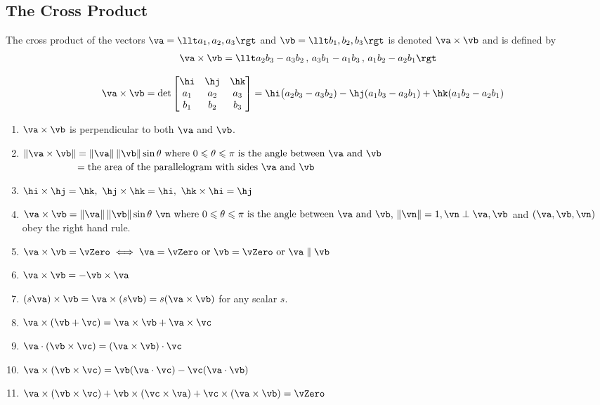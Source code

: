 \subsection{The Cross Product}
\begin{defn}\label{def:crossProd}
The cross product of the vectors $\va=\llt a_1,a_2,a_3\rgt$ and $\vb=\llt b_1,b_2,b_3\rgt$ is denoted $\va\times\vb$ and is defined by
\begin{align*}
\va\times\vb = \llt a_2b_3-a_3b_2\,,\, a_3b_1-a_1b_3\,,\, a_1b_2-a_2b_1\rgt
\end{align*}
\end{defn}
\begin{align*}
\va\times\vb&=\det\left[\begin{matrix}\hi& \hj &\hk\\
a_1&a_2&a_3\\
b_1&b_2&b_3\end{matrix}\right] = \hi\big(a_2b_3-a_3b_2) -\hj(a_1b_3-a_3b_1) +\hk(a_1b_2-a_2b_1)
\end{align*}
\begin{theorem}\label{thm:crossPppties}
\begin{enumerate}
\item $\va\times\vb$ is perpendicular to both $\va$ and $\vb$.
\item $\|\va\times\vb\| = \|\va\|\,\|\vb\|\sin\theta\text{ where $0\leqslant\theta\leqslant\pi$ is the angle between $\va$ and $\vb$}$ \\
$\phantom{|\va\times\vb|} \;= \text{the area of the parallelogram with sides $\va$ and $\vb$}$
\item $\hi\times\hj=\hk,\ \hj\times\hk=\hi,\ \hk\times\hi=\hj$
\item $\va\times\vb = \|\va\|\,\|\vb\|\sin\theta\ \vn\text{ where $0\leqslant\theta\leqslant\pi$ is the angle between $\va$ and $\vb$, }
\|\vn\|=1,\vn\perp\va,\vb$ and $(\va,\vb,\vn)$ obey the right hand rule.
\item $\va\times\vb=\vZero\iff \va=\vZero \text{ or }\vb=\vZero \text{ or }\va\parallel\vb$
\item $\va\times \vb=-\vb\times\va$
\item $(s\va)\times\vb=\va\times(s\vb)=s(\va\times \vb)$ for any scalar $s$.
\item $\va\times(\vb+\vc)=\va\times\vb+\va\times \vc$
\item $\va\cdot(\vb\times\vc)=(\va\times\vb)\cdot\vc$
\item $\va\times(\vb\times\vc) = \vb(\va\cdot\vc) - \vc(\va\cdot\vb)$
\item $\va\times(\vb\times\vc) + \vb\times(\vc\times\va) + \vc\times(\va\times\vb) = \vZero$
\end{enumerate}
\end{theorem}
